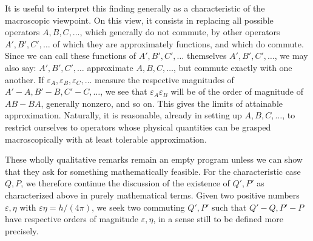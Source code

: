 \documentclass[fontsize=13pt,twoside,openany,headings=normal,parskip=false,bookmarkpackage=false,DIV=calc]{scrbook}
\begin{document}
It is useful to interpret this finding generally as a characteristic of the macroscopic viewpoint. On this view, it consists in replacing all possible operators $A,B,C,\ldots$, which generally do not commute, by other operators $A',B',C',\ldots$ of which they are approximately functions, and which do commute. Since we can call these functions of $A',B',C',\ldots$ themselves $A',B',C',\ldots$, we may also say: $A',B',C',\ldots$ approximate $A,B,C,\ldots$, but commute exactly with one another. If $\varepsilon_A,\varepsilon_B,\varepsilon_C,\ldots$ measure the respective magnitudes of $A'-A,B'-B,C'-C,\ldots$, we see that $\varepsilon_A\varepsilon_B$ will be of the order of magnitude of $AB-BA$, generally nonzero, and so on. This gives the limits of attainable approximation. Naturally, it is reasonable, already in setting up $A,B,C,\ldots$, to restrict ourselves to operators whose physical quantities can be grasped macroscopically with at least tolerable approximation.

These wholly qualitative remarks remain an empty program unless we can show that they ask for something mathematically
\hypertarget{origpage-216}{}%
feasible. For the characteristic case $Q,P$, we therefore continue the discussion of the existence of $Q',P'$ as characterized above in purely mathematical terms. Given two positive numbers $\varepsilon,\eta$ with $\varepsilon\eta=h/(4\pi)$, we seek two commuting $Q',P'$ such that $Q'-Q,P'-P$ have respective orders of magnitude $\varepsilon,\eta$, in a sense still to be defined more precisely.
\end{document}
